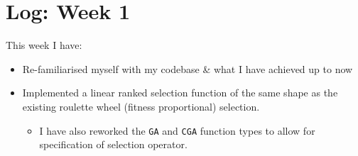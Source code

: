 \documentclass[11pt]{article}
\author{Sam Barrett}
\date{\today}
\title{}
\begin{document}
\section{Log: Week 1}
\label{sec:org43de7ab}

This week I have:

\begin{itemize}
\item Re-familiarised myself with my codebase \& what I have achieved up to now
\item Implemented a linear ranked selection function of the same shape as the existing roulette wheel (fitness proportional) selection.
\begin{itemize}
\item I have also reworked the \texttt{GA} and \texttt{CGA} function types to allow for specification of selection operator.
\end{itemize}
\end{itemize}
\end{document}
